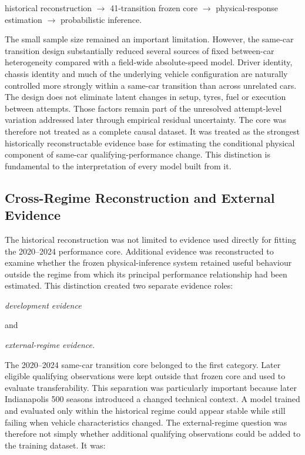 historical reconstruction \ensuremath{\rightarrow} 41-transition frozen core \ensuremath{\rightarrow} physical-response estimation \ensuremath{\rightarrow} probabilistic inference.

The small sample size remained an important limitation. However, the same-car transition design substantially reduced several sources of fixed between-car heterogeneity compared with a field-wide absolute-speed model. Driver identity, chassis identity and much of the underlying vehicle configuration are naturally controlled more strongly within a same-car transition than across unrelated cars. The design does not eliminate latent changes in setup, tyres, fuel or execution between attempts. Those factors remain part of the unresolved attempt-level variation addressed later through empirical residual uncertainty. The core was therefore not treated as a complete causal dataset. It was treated as the strongest historically reconstructable evidence base for estimating the conditional physical component of same-car qualifying-performance change. This distinction is fundamental to the interpretation of every model built from it.

\subsection{Cross-Regime Reconstruction and External Evidence}
The historical reconstruction was not limited to evidence used directly for fitting the 2020--2024 performance core. Additional evidence was reconstructed to examine whether the frozen physical-inference system retained useful behaviour outside the regime from which its principal performance relationship had been estimated. This distinction created two separate evidence roles:

\begin{center}\textit{development evidence}\end{center}

and

\begin{center}\textit{external-regime evidence.}\end{center}

The 2020--2024 same-car transition core belonged to the first category. Later eligible qualifying observations were kept outside that frozen core and used to evaluate transferability. This separation was particularly important because later Indianapolis 500 seasons introduced a changed technical context. A model trained and evaluated only within the historical regime could appear stable while still failing when vehicle characteristics changed. The external-regime question was therefore not simply whether additional qualifying observations could be added to the training dataset. It was:


